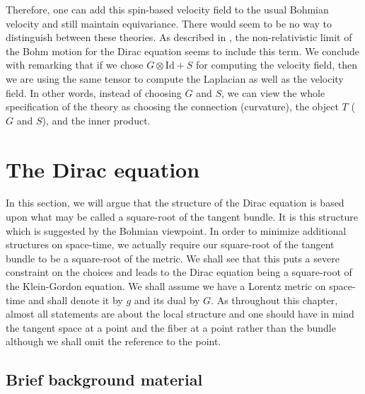 \documentclass[11pt]{article}
\theoremstyle{remark}
\begin{document}
Therefore, one can add this spin-based 
velocity field to the usual Bohmian velocity and still maintain
equivariance. There would seem to be no way to distinguish between
these theories. As described in \cite{BH95}, the non-relativistic limit
of the Bohm motion for the Dirac equation seems to include this
term. We conclude with remarking that if we chose $G\otimes \ensuremath{\text{Id}} +S$
for computing the velocity field, then we are using the same tensor to
compute the Laplacian as well as the velocity field. In other words,
instead of choosing $G$ and $S$, we can view the whole specification
of the theory as choosing the connection (curvature), the object $T$
($G$ and $S$), and the
inner product. 


\section{The Dirac equation}


In this section, we will argue that the structure of the Dirac
equation is based upon what may be called a  square-root of the
tangent bundle. It is this structure which is suggested by the
Bohmian viewpoint. In order to minimize additional structures on
space-time, we actually require our square-root of the tangent bundle
to be a square-root of the metric. We shall see that this puts a severe
constraint on the choices and leads to the Dirac equation being a
square-root of the Klein-Gordon equation. We shall assume we have a
Lorentz metric on space-time and shall denote it by $g$ and its dual
by $G$. As throughout this chapter, almost all statements are about
the local structure and one should have in mind the tangent space at a
point and the fiber at a point rather than the bundle
although we shall omit the reference to the point.

\subsection{Brief background material}
\end{document}

